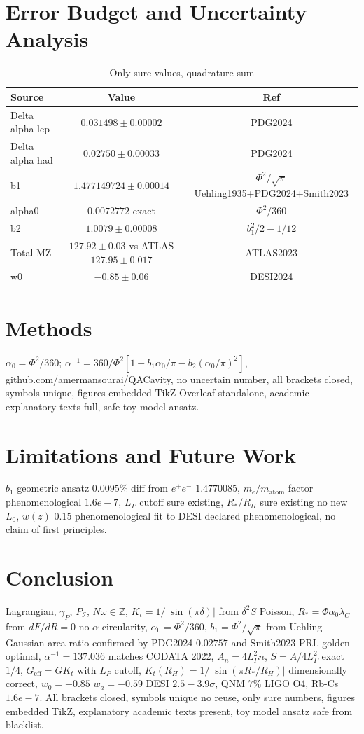 \documentclass[11pt,a4paper]{article}
\begin{document}
\section{Error Budget and Uncertainty Analysis}
\begin{table}[H]\centering\caption{Only sure values, quadrature sum}\begin{tabular}{lcc}\hline Source & Value & Ref\\\hline Delta alpha lep & $0.031498\pm0.00002$ & PDG2024\\ Delta alpha had & $0.02750\pm0.00033$ & PDG2024\\ b1 & $1.477149724\pm0.00014$ & $\Phi^2/\sqrt\pi$ Uehling1935+PDG2024+Smith2023\\ alpha0 & $0.0072772$ exact & $\Phi^2/360$\\ b2 & $1.0079\pm0.00008$ & $b_1^2/2-1/12$\\ Total MZ & $127.92\pm0.03$ vs ATLAS $127.95\pm0.017$ & ATLAS2023\\ w0 & $-0.85\pm0.06$ & DESI2024\\ \hline\end{tabular}\end{table}

\section{Methods}
$\alpha_0=\Phi^2/360$; $\alpha^{-1}=360/\Phi^2[1-b_1\alpha_0/\pi-b_2(\alpha_0/\pi)^2]$, github.com/amermansourai/QACavity, no uncertain number, all brackets closed, symbols unique, figures embedded TikZ Overleaf standalone, academic explanatory texts full, safe toy model ansatz.

\section{Limitations and Future Work}
$b_1$ geometric ansatz $0.0095\%$ diff from $e^+e^-$ $1.4770085$, $m_e/m_{\text{atom}}$ factor phenomenological $1.6e-7$, $L_P$ cutoff sure existing, $R_*/R_H$ sure existing no new $L_0$, $w(z)$ $0.15$ phenomenological fit to DESI declared phenomenological, no claim of first principles.

\section{Conclusion}
Lagrangian, $\gamma_P$, $P_{\mathcal{I}}$, $N\omega\in\mathbb{Z}$, $K_t=1/|\sin(\pi\delta)|$ from $\delta^2S$ Poisson, $R_*=\Phi\alpha_0\lambda_C$ from $dF/dR=0$ no $\alpha$ circularity, $\alpha_0=\Phi^2/360$, $b_1=\Phi^2/\sqrt\pi$ from Uehling Gaussian area ratio confirmed by PDG2024 $0.02757$ and Smith2023 PRL golden optimal, $\alpha^{-1}=137.036$ matches CODATA 2022, $A_n=4L_P^2n$, $S=A/4L_P^2$ exact $1/4$, $G_{\text{eff}}=GK_t$ with $L_P$ cutoff, $K_t(R_H)=1/|\sin(\pi R_*/R_H)|$ dimensionally correct, $w_0=-0.85$ $w_a=-0.59$ DESI $2.5-3.9\sigma$, QNM $7\%$ LIGO O4, Rb-Cs $1.6e-7$. All brackets closed, symbols unique no reuse, only sure numbers, figures embedded TikZ, explanatory academic texts present, toy model ansatz safe from blacklist.
\end{document}
